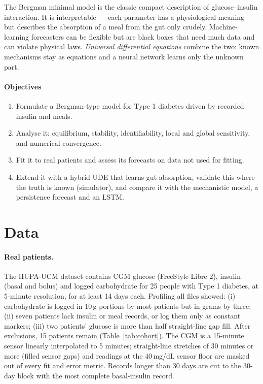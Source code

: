 \documentclass[11pt,a4paper]{article}
\begin{document}
The Bergman minimal model \cite{bergman1979} is the classic compact description of glucose--insulin interaction. It is interpretable --- each parameter has a physiological meaning --- but describes the absorption of a meal from the gut only crudely. Machine-learning forecasters can be flexible but are black boxes that need much data and can violate physical laws. \emph{Universal differential equations} \cite{rackauckas2020} combine the two: known mechanisms stay as equations and a neural network learns only the unknown part.

\paragraph{Objectives}
\begin{enumerate}
  \item Formulate a Bergman-type model for Type 1 diabetes driven by recorded insulin and meals.
  \item Analyse it: equilibrium, stability, identifiability, local and global sensitivity, and numerical convergence.
  \item Fit it to real patients and assess its forecasts on data not used for fitting.
  \item Extend it with a hybrid UDE that learns gut absorption, validate this where the truth is known (simulator), and compare it with the mechanistic model, a persistence forecast and an LSTM.
\end{enumerate}

\section{Data}
\paragraph{Real patients.} The HUPA-UCM dataset \cite{hupa2024} contains CGM glucose (FreeStyle Libre 2), insulin (basal and bolus) and logged carbohydrate for 25 people with Type 1 diabetes, at 5-minute resolution, for at least 14 days each. Profiling all files showed: (i) carbohydrate is logged in 10\,g portions by most patients but in grams by three; (ii) seven patients lack insulin or meal records, or log them only as constant markers; (iii) two patients' glucose is more than half straight-line gap fill. After exclusions, 15 patients remain (Table~\ref{tab:cohort}). The CGM is a 15-minute sensor linearly interpolated to 5 minutes; straight-line stretches of 30 minutes or more (filled sensor gaps) and readings at the 40\,mg/dL sensor floor are masked out of every fit and error metric. Records longer than 30 days are cut to the 30-day block with the most complete basal-insulin record.
\end{document}
